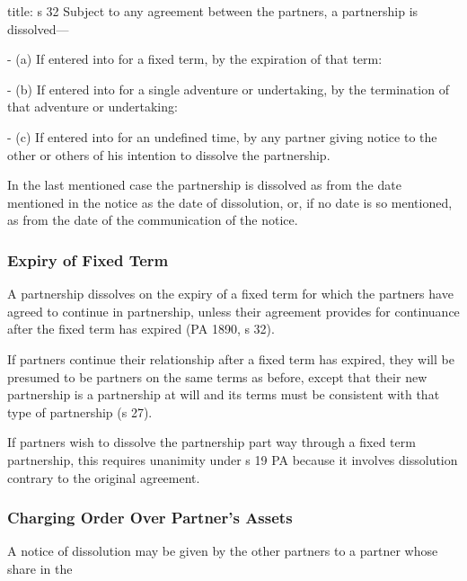 \documentclass[
]{article}
\newenvironment{Shaded}{}{}
\newcommand{\NormalTok}[1]{#1}
\begin{document}
\begin{Shaded}
\begin{Highlighting}[]
\NormalTok{title: s 32}
\NormalTok{Subject to any agreement between the partners, a partnership is dissolved—}

\NormalTok{{-} (a) If entered into for a fixed term, by the expiration of that term:}

\NormalTok{{-} (b) If entered into for a single adventure or undertaking, by the termination of that adventure or undertaking:}

\NormalTok{{-} (c) If entered into for an undefined time, by any partner giving notice to the other or others of his intention to dissolve the partnership.}

\NormalTok{In the last mentioned case the partnership is dissolved as from the date mentioned in the notice as the date of dissolution, or, if no date is so mentioned, as from the date of the communication of the notice.}
\end{Highlighting}
\end{Shaded}

\hypertarget{expiry-of-fixed-term}{%
\subsubsection{Expiry of Fixed Term}\label{expiry-of-fixed-term}}

A partnership dissolves on the expiry of a fixed term for which the
partners have agreed to continue in partnership, unless their agreement
provides for continuance after the fixed term has expired (PA 1890, s
32).

If partners continue their relationship after a fixed term has expired,
they will be presumed to be partners on the same terms as before, except
that their new partnership is a partnership at will and its terms must
be consistent with that type of partnership (s 27).

If partners wish to dissolve the partnership part way through a fixed
term partnership, this requires unanimity under s 19 PA because it
involves dissolution contrary to the original agreement.

\hypertarget{charging-order-over-partners-assets}{%
\subsubsection{Charging Order Over Partner's
Assets}\label{charging-order-over-partners-assets}}

A notice of dissolution may be given by the other partners to a partner
whose share in the
\end{document}
